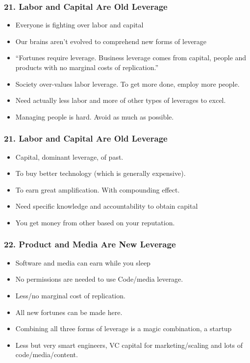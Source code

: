 \begin{frame}[fragile]
\frametitle{21. Labor and Capital Are Old Leverage}
\begin{itemize}
\item Everyone is fighting over labor and capital
\item Our brains aren't evolved to comprehend new forms of leverage
\item ``Fortunes require leverage. Business leverage comes from capital, people and products with no marginal costs of replication.''
\item Society over-values labor leverage. To get more done, employ more people.
\item Need actually less labor and more of other types of leverages to excel.
\item Managing people is hard. Avoid as much as possible.

\end{itemize}
\end{frame}

\begin{frame}[fragile]
\frametitle{21. Labor and Capital Are Old Leverage}
\begin{itemize}
\item Capital, dominant leverage, of past.
\item To buy better technology (which is generally expensive).
\item To earn great amplification. With compounding effect.
\item Need specific knowledge and accountability to obtain capital
\item You get money from other based on your reputation.

\end{itemize}
\end{frame}

\begin{frame}[fragile]
\frametitle{22. Product and Media Are New Leverage}
\begin{itemize}
\item Software and media can earn while you sleep
\item No permissions are needed to use Code/media leverage.
\item Less/no marginal cost of replication.
\item All new fortunes can be made here.
\item Combining all three forms of leverage is a magic combination, a startup
\item Less but very smart engineers, VC capital for marketing/scaling and lots of code/media/content.
\end{itemize}
\end{frame}

